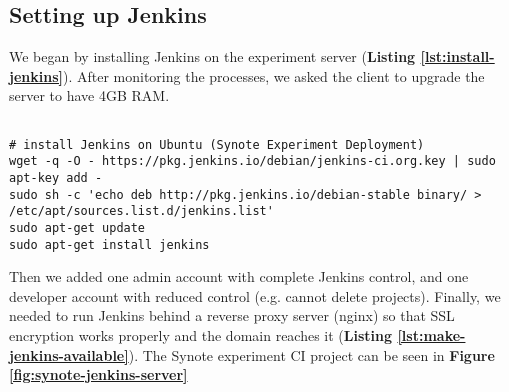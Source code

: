 \subsection{Setting up Jenkins}
\label{subsec:setting-up-jenkins}

We began by installing Jenkins on the experiment server (\textbf{Listing \ref{lst:install-jenkins}}). After monitoring the processes, we asked the client to upgrade the server to have 4GB RAM.

\begin{listing}[H]
\begin{verbatim}

# install Jenkins on Ubuntu (Synote Experiment Deployment)
wget -q -O - https://pkg.jenkins.io/debian/jenkins-ci.org.key | sudo apt-key add -
sudo sh -c 'echo deb http://pkg.jenkins.io/debian-stable binary/ > /etc/apt/sources.list.d/jenkins.list'
sudo apt-get update
sudo apt-get install jenkins

\end{verbatim}
\label{lst:install-jenkins}
\end{listing}

Then we added one admin account with complete Jenkins control, and one developer account with reduced control (e.g. cannot delete projects). Finally, we needed to run Jenkins behind a reverse proxy server (nginx) so that SSL encryption works properly and the domain reaches it (\textbf{Listing \ref{lst:make-jenkins-available}}). The Synote experiment CI project can be seen in \textbf{Figure \ref{fig:synote-jenkins-server}}

